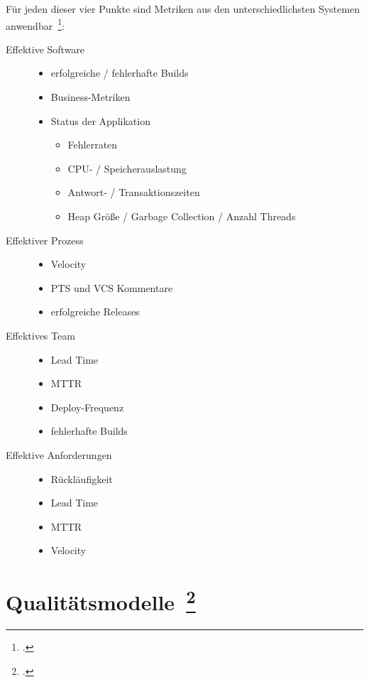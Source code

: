 Für jeden dieser vier Punkte sind Metriken aus den unterschiedlichsten Systemen anwendbar~\footcite[vgl.][S.219ff]{davis_agile_2015}:

\clearpage
\begin{description}
  \item[Effektive Software] \hfill
  \begin{itemize}[noitemsep]
    \item erfolgreiche / fehlerhafte Builds
    \item Business-Metriken
    \item Status der Applikation
    \begin{itemize}[noitemsep]
      \item Fehlerraten
      \item CPU- / Speicherauslastung
      \item Antwort- / Transaktionszeiten
      \item Heap Größe / Garbage Collection / Anzahl Threads
    \end{itemize}
  \end{itemize}
  \item[Effektiver Prozess] \hfill
  \begin{itemize}[noitemsep]
    \item Velocity
    \item \ac{PTS} und \ac{VCS} Kommentare
    \item erfolgreiche Releases
  \end{itemize}
  \item[Effektives Team] \hfill
  \begin{itemize}[noitemsep]
    \item Lead Time
    \item \ac{MTTR}
    \item Deploy-Frequenz
    \item fehlerhafte Builds
  \end{itemize}
  \item[Effektive Anforderungen] \hfill
  \begin{itemize}[noitemsep]
    \item Rückläufigkeit
    \item Lead Time
    \item \ac{MTTR}
    \item Velocity
  \end{itemize}
\end{description}

\clearpage
\section[Qualitätsmodelle]{Qualitätsmodelle~\footcite[vgl.][S.29ff]{wagner_software_2013}}

